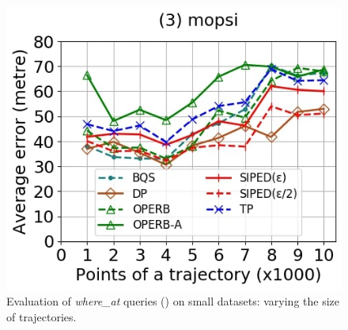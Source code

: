 {\begin{figure}[tb!]
	\includegraphics[scale=0.250]{Figures/Exp-where-PED-error-size-mopsi.jpg}		
	\vspace{-2ex}
	\caption{\small Evaluation of {\emph{where\_at}} queries (\ped) on small datasets: varying the size of
		trajectories.}
	\label{fig:query-ped-size}
	\vspace{-1ex}
\end{figure}

}
